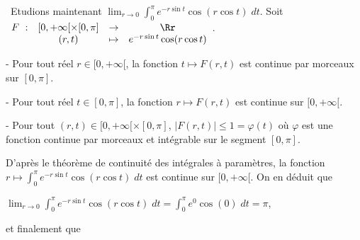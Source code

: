 {\begin{enumerate}
{\textbullet~Etudions maintenant $\lim_{r \rightarrow 0}\int_{0}^{\pi}e^{-r\sin t}\cos(r\cos t)\;dt$. Soit $\begin{array}[t]{cccc}
F~:&[0,+\infty[\times[0,\pi]&\rightarrow&\Rr\\
 &(r,t)&\mapsto&e^{-r\sin t}\cos(r\cos t)
\end{array}$.

- Pour tout réel $r\in[0,+\infty[$, la fonction $t\mapsto F(r,t)$ est continue par morceaux sur $[0,\pi]$.

- Pour tout réel $t\in[0,\pi]$, la fonction $r\mapsto F(r,t)$ est continue sur $[0,+\infty[$.

- Pour tout $(r,t)\in[0,+\infty[\times[0,\pi]$, $|F(r,t)|\leqslant1=\varphi(t)$ où $\varphi$ est une fonction continue par morceaux et intégrable sur le segment $[0,\pi]$.

D'après le théorème de continuité des intégrales à paramètres, la fonction $r\mapsto\int_{0}^{\pi}e^{-r\sin t}\cos(r\cos t)\;dt$ est continue sur $[0,+\infty[$. On en déduit que

\begin{center}
$\lim_{r \rightarrow 0}\int_{0}^{\pi}e^{-r\sin t}\cos(r\cos t)\;dt=\int_{0}^{\pi}e^0\cos(0)\;dt=\pi$,
\end{center}

et finalement que

\begin{center}
\end{center}}
\end{enumerate}
}